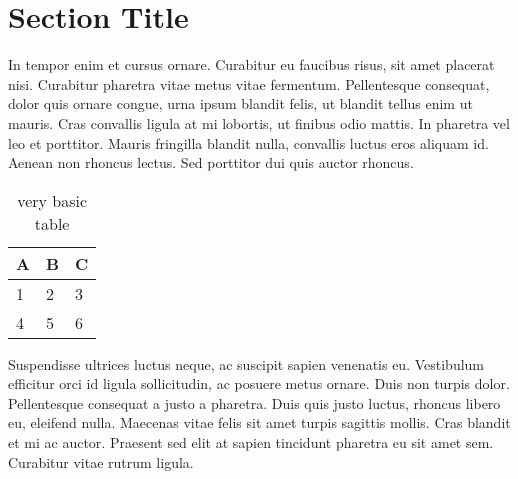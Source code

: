 \section{Section Title}
In tempor enim et cursus ornare. Curabitur eu faucibus risus, sit amet placerat nisi. Curabitur pharetra vitae metus vitae fermentum. Pellentesque consequat, dolor quis ornare congue, urna ipsum blandit felis, ut blandit tellus enim ut mauris. Cras convallis ligula at mi lobortis, ut finibus odio mattis. In pharetra vel leo et porttitor. Mauris fringilla blandit nulla, convallis luctus eros aliquam id. Aenean non rhoncus lectus. Sed porttitor dui quis auctor rhoncus. 

\begin{table}[h]
    \centering
    \begin{tabular}{l | l | l}
        A & B & C \\
        \hline
        1 & 2 & 3 \\
        4 & 5 & 6
    \end{tabular}
    \caption{very basic table}
    \label{tab:abc}
\end{table}

Suspendisse ultrices luctus neque, ac suscipit sapien venenatis eu. Vestibulum efficitur orci id ligula sollicitudin, ac posuere metus ornare. Duis non turpis dolor. Pellentesque consequat a justo a pharetra. Duis quis justo luctus, rhoncus libero eu, eleifend nulla. Maecenas vitae felis sit amet turpis sagittis mollis. Cras blandit et mi ac auctor. Praesent sed elit at sapien tincidunt pharetra eu sit amet sem. Curabitur vitae rutrum ligula.

